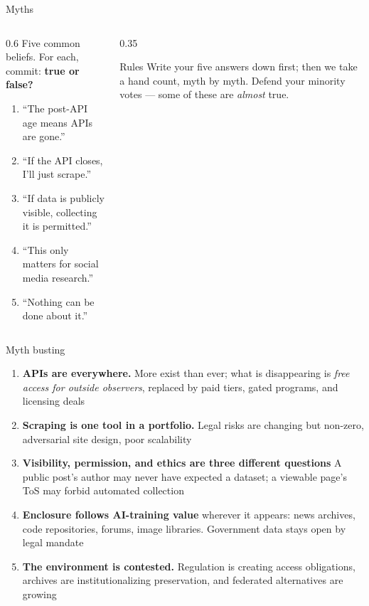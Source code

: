 \documentclass[9pt,aspectratio=169]{beamer}
\begin{document}
\begin{frame}{Myths}
    \begin{columns}[T]
        \begin{column}{0.6\textwidth}
            Five common beliefs. For each, commit: \textbf{true or false?}
            \begin{enumerate}
                \item ``The post-API age means APIs are gone.''
                \item ``If the API closes, I'll just scrape.''
                \item ``If data is publicly visible, collecting it is permitted.''
                \item ``This only matters for social media research.''
                \item ``Nothing can be done about it.''
            \end{enumerate}
        \end{column}
        \begin{column}{0.35\textwidth}
            \begin{alertblock}{Rules}
                \small Write your five answers down first; then we take a hand count, myth by myth. Defend your minority votes --- some of these are \textit{almost} true.
            \end{alertblock}
        \end{column}
    \end{columns}
\end{frame}

\begin{frame}{Myth busting}
    \begin{enumerate}
        \item \textbf{APIs are everywhere.} More exist than ever; what is disappearing is \textit{free access for outside observers}, replaced by paid tiers, gated programs, and licensing deals
        \item \textbf{Scraping is one tool in a portfolio.} Legal risks are changing but non-zero, adversarial site design, poor scalability
        \item \textbf{Visibility, permission, and ethics are three different questions} A public post's author may never have expected a dataset; a viewable page's ToS may forbid automated collection
        \item \textbf{Enclosure follows AI-training value} wherever it appears: news archives, code repositories, forums, image libraries. Government data stays open by legal mandate
        \item \textbf{The environment is contested.} Regulation is creating access obligations, archives are institutionalizing preservation, and federated alternatives are growing
    \end{enumerate}
\end{frame}
\end{document}

